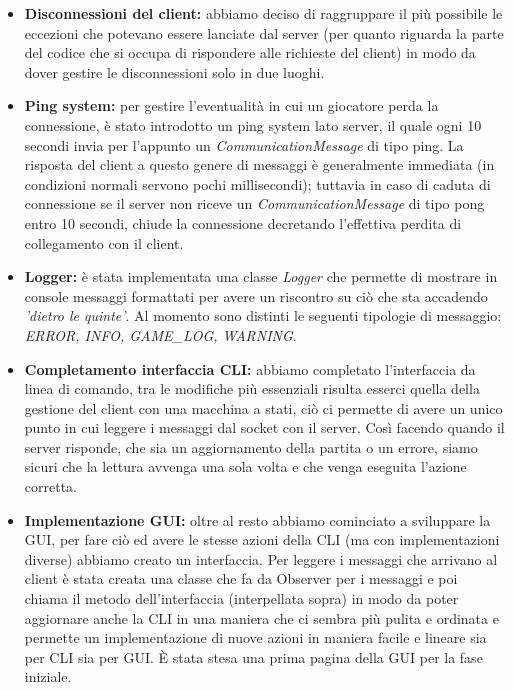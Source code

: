 \documentclass[a4paper, 12pt]{article}
\begin{document}
	\begin{itemize}
		\item \textbf{Disconnessioni del client:} abbiamo deciso di raggruppare il più possibile le eccezioni che potevano essere lanciate dal server (per quanto riguarda la parte del codice che si occupa di rispondere alle richieste del client) in modo da dover gestire le disconnessioni solo in due luoghi.
		\item \textbf{Ping system:} per gestire l'eventualità in cui un giocatore perda la connessione, è stato introdotto un ping system lato server, il quale ogni 10 secondi invia per l'appunto un \textit{CommunicationMessage} di tipo ping. La risposta del client a questo genere di messaggi è generalmente immediata (in condizioni normali servono pochi millisecondi); tuttavia in caso di caduta di connessione se il server non riceve un \textit{CommunicationMessage} di tipo pong entro 10 secondi, chiude la connessione decretando l'effettiva perdita di collegamento con il client.
		\item \textbf{Logger:} è stata implementata una classe \textit{Logger} che permette di mostrare in console messaggi formattati per avere un riscontro su ciò che sta accadendo \textit{'dietro le quinte'}. Al momento sono distinti le seguenti tipologie di messaggio: \textit{ERROR, INFO, GAME\_LOG, WARNING}.
		\item \textbf{Completamento interfaccia CLI:} abbiamo completato l'interfaccia da linea di comando, tra le modifiche più essenziali risulta esserci quella della gestione del client con una macchina a stati, ciò ci permette di avere un unico punto in cui leggere i messaggi dal socket con il server. Così facendo quando il server risponde, che sia un aggiornamento della partita o un errore, siamo sicuri che la lettura avvenga una sola volta e che venga eseguita l'azione corretta.
		\item \textbf{Implementazione GUI:} oltre al resto abbiamo cominciato a sviluppare la GUI, per fare ciò ed avere le stesse azioni della CLI (ma con implementazioni diverse) abbiamo creato un interfaccia. 
		Per leggere i messaggi che arrivano al client è stata creata una classe che fa da Observer per i messaggi e poi chiama il metodo dell'interfaccia (interpellata sopra) in modo da poter aggiornare anche la CLI in una maniera che ci sembra più pulita e ordinata e permette un implementazione di nuove azioni in maniera facile e lineare sia per CLI sia per GUI. 
		È stata stesa una prima pagina della GUI per la fase iniziale.
		\begin{figure}[h!]

\end{figure}
\end{itemize}
\end{document}
